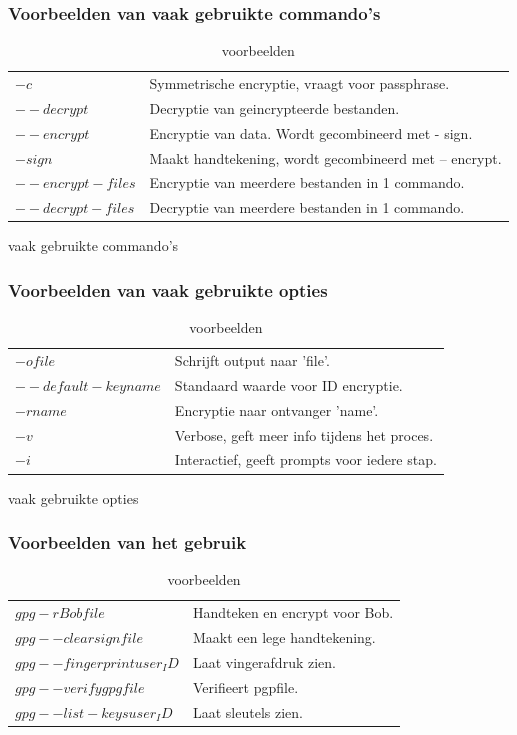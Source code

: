 \documentclass[12pt]{article}
\begin{document}
				\subsubsection{Voorbeelden van vaak gebruikte commando's}\label{com}
					\begin{table}[!ht]
						\begin{tabular}{l|l}
								$-c$				&	Symmetrische encryptie, vraagt voor 																	passphrase.\\
								$--decrypt$			&	Decryptie van geincrypteerde bestanden.\\
								$--encrypt$			&	Encryptie van data. Wordt gecombineerd met -															sign.\\
								$-sign$				&	Maakt handtekening, wordt gecombineerd met --															encrypt.\\
								$--encrypt-files$	&	Encryptie van meerdere bestanden in 1 																	commando.\\
								$--decrypt-files$	&	Decryptie van meerdere bestanden in 1 																	commando.\\
						\end{tabular}
						\caption{vaak gebruikte commando's}						
					
				\subsubsection{Voorbeelden van vaak gebruikte opties}\label{opt}					
						\begin{tabular}{l|l}
								$-o file$				&	Schrijft output naar 'file'.\\
								$--default-key name$	&	Standaard waarde voor ID encryptie.\\
								$-r name$				&	Encryptie naar ontvanger 'name'.\\
								$-v$					&	Verbose, geft meer info tijdens het 																	proces.\\
								$-i$					&	Interactief, geeft prompts voor iedere 																	stap.\\
						\end{tabular}\caption{vaak gebruikte opties}
											
				\subsubsection{Voorbeelden van het gebruik}\label{use}
						\begin{tabular}{l|l}
								$gpg -r Bob file$				&	Handteken en encrypt voor Bob.\\
								$gpg --clearsign file$			&	Maakt een lege handtekening.\\
								$gpg --fingerprint user_ID$		&	Laat vingerafdruk zien.\\
								$gpg --verify gpgfile$			&	Verifieert pgpfile.\\
								$gpg --list-keys user_ID$		&	Laat sleutels zien.\\
						\end{tabular}
						\caption{voorbeelden}
					\end{table}	
			
\end{document}
